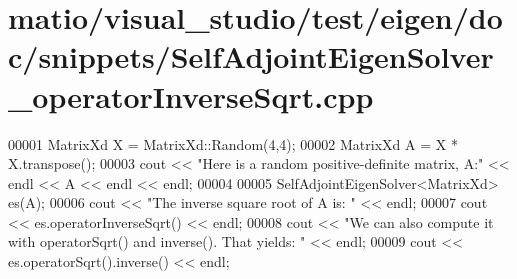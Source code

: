 \hypertarget{matio_2visual__studio_2test_2eigen_2doc_2snippets_2_self_adjoint_eigen_solver__operator_inverse_sqrt_8cpp_source}{}\section{matio/visual\+\_\+studio/test/eigen/doc/snippets/\+Self\+Adjoint\+Eigen\+Solver\+\_\+operator\+Inverse\+Sqrt.cpp}
\label{matio_2visual__studio_2test_2eigen_2doc_2snippets_2_self_adjoint_eigen_solver__operator_inverse_sqrt_8cpp_source}

\begin{DoxyCode}
00001 MatrixXd X = MatrixXd::Random(4,4);
00002 MatrixXd A = X * X.transpose();
00003 cout << \textcolor{stringliteral}{"Here is a random positive-definite matrix, A:"} << endl << A << endl << endl;
00004 
00005 SelfAdjointEigenSolver<MatrixXd> es(A);
00006 cout << \textcolor{stringliteral}{"The inverse square root of A is: "} << endl;
00007 cout << es.operatorInverseSqrt() << endl;
00008 cout << \textcolor{stringliteral}{"We can also compute it with operatorSqrt() and inverse(). That yields: "} << endl;
00009 cout << es.operatorSqrt().inverse() << endl;
\end{DoxyCode}
